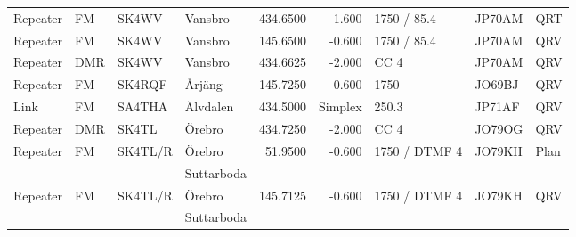 \begin{longtable}{llllrrlll}
Repeater & FM         & SK4WV    & Vansbro             & 434.6500     & -1.600     & 1750 / 85.4   & JP70AM      & QRT      \\
Repeater & FM         & SK4WV    & Vansbro             & 145.6500     & -0.600     & 1750 / 85.4   & JP70AM      & QRV      \\
Repeater & DMR        & SK4WV    & Vansbro             & 434.6625     & -2.000     & CC 4          & JP70AM      & QRV      \\
Repeater & FM         & SK4RQF   & Årjäng              & 145.7250     & -0.600     & 1750          & JO69BJ      & QRV      \\
Link     & FM         & SA4THA   & Älvdalen            & 434.5000     & Simplex    & 250.3         & JP71AF      & QRV      \\
Repeater & DMR        & SK4TL    & Örebro              & 434.7250     & -2.000     & CC 4          & JO79OG      & QRV      \\
Repeater & FM         & SK4TL/R  & Örebro              & 51.9500      & -0.600     & 1750 / DTMF 4 & JO79KH      & Plan     \\
         &            &          & Suttarboda          &              &            &               &             &          \\
Repeater & FM         & SK4TL/R  & Örebro              & 145.7125     & -0.600     & 1750 / DTMF 4 & JO79KH      & QRV      \\
         &            &          & Suttarboda          &              &            &               &             &          \\
\end{longtable}
\normalsize


\clearpage

